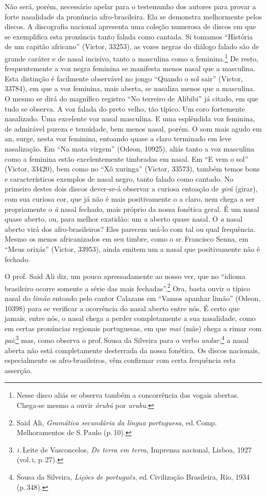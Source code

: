 Não será, porém, necessário apelar para o testemunho dos autores para
provar a forte nasalidade da pronúncia afro-brasileira. Ela se demonstra
melhormente pelos discos. A discografia nacional apresenta uma coleção
numerosa de discos em que se exemplifica esta pronúncia tanto falada
como cantada. Si tomamos ``História de um capitão africano'' (Victor,
33253), as vozes negras do diálogo falado são de grande caráter e de
nasal incisivo, tanto a masculina como a feminina.\footnote{Nesse disco aliás se observa também a concorrência das vogais
abertas. Chega-se mesmo a ouvir \textit{ôrubú} por \textit{urubu}.} De resto,
frequentemente a voz negra feminina se manifesta menos nasal que a
masculina. Esta distinção é facilmente observável no jongo ``Quando o
sol sair'' (Victor, 33784), em que a voz feminina, mais aberta, se
nasaliza menos que a masculina. O mesmo se dirá do magnífico registro
``No terreiro de Alibibi'' já citado, em que tudo se observa. A voz
falada do preto velho, tão típico. Um coro fortemente nasalizado. Uma
excelente voz nasal masculina. E uma esplêndida voz feminina, de
admirável pureza e tenuidade, bem menos nasal, porém. O som mais agudo
em an, surge, nesta voz feminina, entoando quase a claro terminado em
leve nasalização. Em ``Na mata virgem'' (Odeon, 10925), aliás tanto a voz
masculina como a feminina estão excelentemente timbradas em nasal. Em ``E
vem o sol'' (Victor, 33420), bem como no ``Xô xuringa'' (Victor, 33573),
também temos bons e característicos exemplos de nasal negro, tanto
falado como cantado. No primeiro destes dois discos dever-se-á observar
a curiosa entoação de \textit{girá} (girar), com sua curiosa cor, que já não
é mais positivamente o a claro, nem chega a ser propriamente o \textit{ã} nasal
fechado, mais próprio da nossa fonética geral. É um nasal quase aberto,
ou, para melhor exatidão: um \textit{a} aberto quase nasal. O \textit{a} nasal aberto virá
dos afro-brasileiros? Eles parecem usá-lo com tal ou qual frequência.
Mesmo os menos africanizados em seu timbre, como o sr.\,Francisco Senna,
em ``Meus orixás'' (Victor, 33953), ainda emitem um a nasal que
positivamente não é fechado.

O prof. Said Ali diz, um pouco apressadamente ao nosso ver, que no
``idioma brasileiro ocorre somente a série das mais fechadas''.\footnote{Said Ali, \emph{Gramática secundária da língua portuguesa}, ed.\,Comp.
Melhoramentos de S.\,Paulo (p.\,10).}
Ora, basta ouvir o típico nasal do \textit{limão} entoado pelo cantor
Calazans em ``Vamos apanhar limão'' (Odeon, 10398) para se verificar a
ocorrência do nasal aberto entre nós. É certo que jamais, entre nós, o
nasal chega a perder completamente a sua nasalidade, como em certas
pronúncias regionais portuguesas, em que \textit{mai} (mãe) chega a rimar com
\textit{pai};\footnote{\textsc{j}.\,Leite de Vasconcelos, \emph{De terra em terra}, Imprensa nacional,
Lisboa, 1927 (vol.\,\textsc{i}, p.\,27).} mas, como observa o prof.\,Sousa da Silveira para o verbo
\textit{andar},\footnote{Sousa da Silveira, \emph{Lições de português}, ed.\,Civilização Brasileira,
Rio, 1934 (p.\,348).} a nasal aberta não está completamente desterrada da nossa
fonética. Os discos nacionais, especialmente os afro-brasileiros, vêm
confirmar com certa frequência esta asserção.

